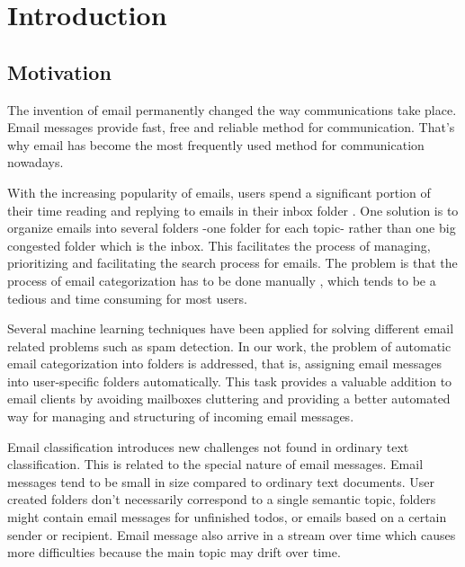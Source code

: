 
\chapter{Introduction} %

\label{Chapter1} %


\section{Motivation}

The invention of email permanently changed the way communications take place. Email messages provide fast, free and reliable method for communication. That's why email has become the most frequently used method for communication nowadays.

With the increasing popularity of emails, users spend a significant portion of their time reading and replying to emails in their inbox folder . One solution is to organize emails into several folders -one folder for each topic- rather than one big congested folder which is the inbox. This facilitates the process of managing, prioritizing and facilitating the search process for emails. The problem is that the process of email categorization has to be done manually , which tends to be a tedious and time consuming for most users.

Several machine learning techniques have been applied for solving different email related problems such as spam detection. In our work, the problem of automatic email categorization into folders is addressed, that is, assigning email messages into user-specific folders automatically. This task provides a valuable addition to email clients by avoiding mailboxes cluttering and providing a better automated way for managing and structuring of incoming email messages.

	Email classification introduces new challenges not found in ordinary text classification. This is related to the special nature of email messages. Email messages tend to be small in size compared to ordinary text documents. User created folders don’t necessarily correspond to a single semantic topic, folders might contain email messages for unfinished todos, or emails based on a certain sender or recipient. Email message also arrive in a stream over time which causes more difficulties because the main topic may drift over time.


